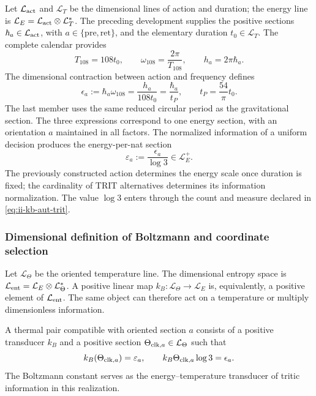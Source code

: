 Let \(\mathcal L_{\rm act}\) and \(\mathcal L_T\) be the dimensional
lines of action and duration; the energy line is
\(\mathcal L_E=\mathcal L_{\rm act}\otimes\mathcal L_T^*\).
The preceding development supplies the positive sections
\(\hbar_a\in\mathcal L_{\rm act}\), with
\(a\in\{\mathrm{pre},\mathrm{ret}\}\), and the elementary duration
\(t_0\in\mathcal L_T\). The complete calendar provides
\[
 T_{108}=108t_0,\qquad
 \omega_{108}=\frac{2\pi}{T_{108}},\qquad
 h_a=2\pi\hbar_a.
\]
The dimensional contraction between action and frequency defines
\begin{equation}
 \epsilon_a:=\hbar_a\omega_{108}
 =\frac{h_a}{108t_0}
 =\frac{\hbar_a}{t_P},\qquad
 t_P=\frac{54}{\pi}t_0.
 \label{eq:ii-kb-aut-energia}
\end{equation}
The last member uses the same reduced circular period as the
gravitational section. The three expressions correspond to one
energy section, with an orientation \(a\) maintained in all
factors. The normalized information of a uniform decision
produces the energy-per-nat section
\begin{equation}
 \varepsilon_a:=\frac{\epsilon_a}{\log3}\in\mathcal L_E^+.
 \label{eq:ii-kb-aut-energia-nat}
\end{equation}
The previously constructed action determines the energy scale once
duration is fixed; the cardinality of TRIT alternatives determines its
information normalization. The value \(\log3\) enters through the
count and measure declared in \eqref{eq:ii-kb-aut-trit}.

\subsubsection{Dimensional definition of Boltzmann and coordinate selection}

Let \(\mathcal L_\Theta\) be the oriented temperature line.
The dimensional entropy space is
\(\mathcal L_{\rm ent}=\mathcal L_E\otimes\mathcal L_\Theta^*\).
A positive linear map
\(k_B:\mathcal L_\Theta\to\mathcal L_E\) is, equivalently,
a positive element of \(\mathcal L_{\rm ent}\). The same
object can therefore act on a temperature or multiply dimensionless
information.

\begin{definition}
A thermal pair compatible with oriented section \(a\) consists of
a positive transducer \(k_B\) and a positive section
\(\Theta_{{\rm clk},a}\in\mathcal L_\Theta\) such that
\begin{equation}
 k_B(\Theta_{{\rm clk},a})=\varepsilon_a,
 \qquad
 k_B\Theta_{{\rm clk},a}\log3=\epsilon_a.
 \label{eq:ii-kb-aut-par-termico}
\end{equation}
The Boltzmann constant serves as the energy--temperature
transducer of tritic information in this realization.
\end{definition}

